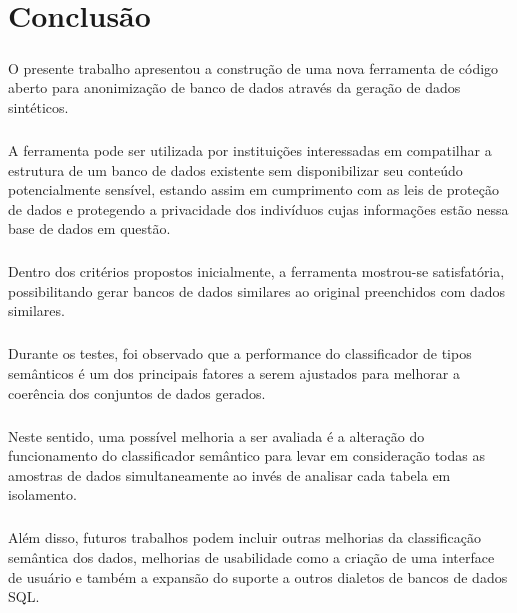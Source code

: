 \chapter{Conclusão}
\label{cap6}

\paragraph{} O presente trabalho apresentou a construção de uma nova ferramenta de código aberto para anonimização de banco de dados através da geração de dados sintéticos.

\paragraph{} A ferramenta pode ser utilizada por instituições interessadas em compatilhar a estrutura de um banco de dados existente sem disponibilizar seu conteúdo potencialmente sensível, estando assim em cumprimento com as leis de proteção de dados e protegendo a privacidade dos indivíduos cujas informações estão nessa base de dados em questão.

\paragraph{} Dentro dos critérios propostos inicialmente, a ferramenta mostrou-se satisfatória, possibilitando gerar bancos de dados similares ao original preenchidos com dados similares.

\paragraph{} Durante os testes, foi observado que a performance do classificador de tipos semânticos é um dos principais fatores a serem ajustados para melhorar a coerência dos conjuntos de dados gerados.

\paragraph{} Neste sentido, uma possível melhoria a ser avaliada é a alteração do funcionamento do classificador semântico para levar em consideração todas as amostras de dados simultaneamente ao invés de analisar cada tabela em isolamento.

\paragraph{} Além disso, futuros trabalhos podem incluir outras melhorias da classificação semântica dos dados, melhorias de usabilidade como a criação de uma interface de usuário e também a expansão do suporte a outros dialetos de bancos de dados SQL.